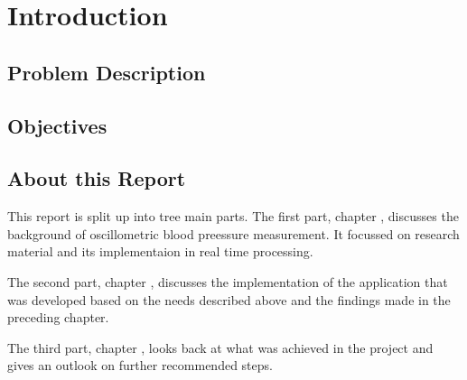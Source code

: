 \chapter{Introduction}\label{cp:Intro}

\section{Problem Description}



\section{Objectives}



\section{About this Report}
This report is split up into tree main parts. The first part, chapter , discusses the background of oscillometric blood preessure measurement. It focussed on research material and its implementaion in real time processing. 

The second part, chapter , discusses the implementation of the application that was developed based on the needs described above and the findings made in the preceding chapter.

The third part, chapter , looks back at what was achieved in the project and gives an outlook on further recommended steps.